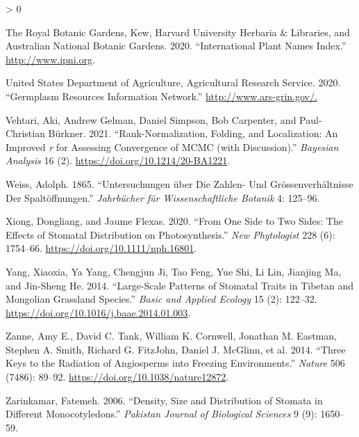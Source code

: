 \documentclass[
  10pt,
]{article}
\newlength{\cslhangindent}
\newenvironment{CSLReferences}[2] %
 {%
  \setlength{\parindent}{0pt}
  \ifodd #1 \everypar{\setlength{\hangindent}{\cslhangindent}}\ignorespaces\fi
  \ifnum #2 > 0
  \setlength{\parskip}{#2\baselineskip}
  \fi
 }%
 {}
\begin{document}
\begin{CSLReferences}{1}{0}
\leavevmode\hypertarget{ref-the_royal_botanic_gardens_international_2020}{}%
The Royal Botanic Gardens, Kew, Harvard University Herbaria \& Libraries, and Australian National Botanic Gardens. 2020. {``International {Plant} {Names} {Index}.''} \url{http://www.ipni.org}.

\leavevmode\hypertarget{ref-united_states_department_of_agriculture_agricultural_research_service_germplasm_2020}{}%
United States Department of Agriculture, Agricultural Research Service. 2020. {``Germplasm {Resources} {Information} {Network}.''} \url{http://www.ars-grin.gov/.}

\leavevmode\hypertarget{ref-vehtari_rank-normalization_2021}{}%
Vehtari, Aki, Andrew Gelman, Daniel Simpson, Bob Carpenter, and Paul-Christian Bürkner. 2021. {``Rank-{Normalization}, {Folding}, and {Localization}: {An} {Improved} \emph{r} for {Assessing} {Convergence} of {MCMC} (with {Discussion}).''} \emph{Bayesian Analysis} 16 (2). \url{https://doi.org/10.1214/20-BA1221}.

\leavevmode\hypertarget{ref-weiss_untersuchungen_1865}{}%
Weiss, Adolph. 1865. {``Untersuchungen über Die {Zahlen}- Und {Grössenverhältnisse} Der {Spaltöffnungen}.''} \emph{Jahrbücher für Wissenschaftliche Botanik} 4: 125--96.

\leavevmode\hypertarget{ref-xiong_one_2020}{}%
Xiong, Dongliang, and Jaume Flexas. 2020. {``From One Side to Two Sides: The Effects of Stomatal Distribution on Photosynthesis.''} \emph{New Phytologist} 228 (6): 1754--66. \url{https://doi.org/10.1111/nph.16801}.

\leavevmode\hypertarget{ref-yang_large-scale_2014}{}%
Yang, Xiaoxia, Ya Yang, Chengjun Ji, Tao Feng, Yue Shi, Li Lin, Jianjing Ma, and Jin-Sheng He. 2014. {``Large-Scale Patterns of Stomatal Traits in {Tibetan} and {Mongolian} Grassland Species.''} \emph{Basic and Applied Ecology} 15 (2): 122--32. \url{https://doi.org/10.1016/j.baae.2014.01.003}.

\leavevmode\hypertarget{ref-zanne_three_2014}{}%
Zanne, Amy E., David C. Tank, William K. Cornwell, Jonathan M. Eastman, Stephen A. Smith, Richard G. FitzJohn, Daniel J. McGlinn, et al. 2014. {``Three Keys to the Radiation of Angiosperms into Freezing Environments.''} \emph{Nature} 506 (7486): 89--92. \url{https://doi.org/10.1038/nature12872}.

\leavevmode\hypertarget{ref-zarinkamar_density_2006}{}%
Zarinkamar, Fatemeh. 2006. {``Density, Size and Distribution of Stomata in Different Monocotyledons.''} \emph{Pakistan Journal of Biological Sciences} 9 (9): 1650--59.


\end{CSLReferences}
\end{document}
